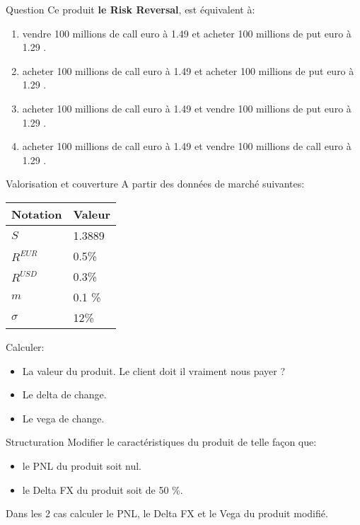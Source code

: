 \documentclass{beamer}
\begin{document}
\begin{frame}{Question}
Ce produit \textbf{le Risk Reversal}, est équivalent à:\\
\vspace{0.5cm}
\begin{enumerate}
\item vendre 100 millions de call euro à 1.49 et acheter 100 millions de put euro à 1.29 .
\item acheter 100 millions de call euro à 1.49 et acheter 100 millions de put euro à 1.29 .
\item acheter 100 millions de call euro à 1.49 et vendre 100 millions de put euro à 1.29 .
\item acheter 100 millions de call euro à 1.49 et vendre 100 millions de call euro à 1.29 .
\end{enumerate}

\end{frame}

\begin{frame}{Valorisation et couverture}
A partir des données de marché suivantes:\\
\begin{center}
\begin{tabular}{|l|l|}
\hline
\textbf{Notation} & \textbf{Valeur} \\
\hline
\hline
$S$ & 1.3889 \\
$R^{EUR}$ & 0.5\% \\
$R^{USD}$ & 0.3\% \\
$m$ & 0.1 \% \\
$\sigma$ & 12\% \\
\hline
\end{tabular}
\end{center}
Calculer:
\begin{itemize}
\item La valeur du produit. Le client doit il vraiment nous payer ?\\
\item Le delta de change. \\
\item Le vega de change. \\ 
\end{itemize}
\end{frame}

\begin{frame}{Structuration}
Modifier le caractéristiques du produit de telle façon que:\\
\begin{itemize}
\item le PNL du produit soit nul.
\item le Delta FX du produit soit de 50 \%.
\end{itemize}
\vspace{0.5cm}
Dans les 2 cas calculer le PNL, le Delta FX et le Vega du produit modifié.
\end{frame}
\end{document}
